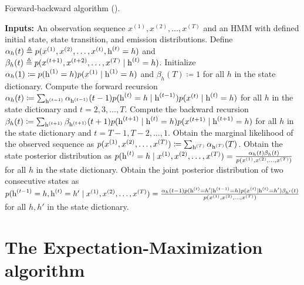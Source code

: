 \begin{algorithm}
    \caption{Forward-backward algorithm (\citet{Rabiner1986}).}
    \label{alg:forward_backward}
    \begin{algorithmic}[1]
        \State \textbf{Inputs:} An observation sequence $x^{(1)}, x^{(2)}, \dots, x^{(T)}$ and an HMM with defined initial state, state transition, and emission distributions.
        \vspace{0.3cm}
        \State Define $\alpha_h(t) \triangleq p(x^{(1)}, x^{(2)}, \dots, x^{(t)}, {\textnormal{h}}^{(t)}=h)$ and $\beta_h(t) \triangleq p(x^{(t+1)}, x^{(t+2)}, \dots, x^{(T)} \mid {\textnormal{h}}^{(t)}=h)$.
        \vspace{0.3cm}
        \State Initialize $\alpha_h(1) \coloneqq p({\textnormal{h}}^{(1)}=h)p(x^{(1)} \mid {\textnormal{h}}^{(1)}=h)$ and $\beta_h(T) \coloneqq 1$ for all $h$ in the state dictionary.
        \vspace{0.3cm}
        \State Compute the forward recursion $\alpha_h(t) \coloneqq \sum_{{\textnormal{h}}^{(t-1)}} \alpha_{{\textnormal{h}}^{(t-1)}}(t-1) p({\textnormal{h}}^{(t)}=h \mid {\textnormal{h}}^{(t-1)}) p(x^{(t)} \mid {\textnormal{h}}^{(t)}=h)$ for all $h$ in the state dictionary and $t=2, 3, \dots, T$.
        \vspace{0.3cm}
        \State Compute the backward recursion $\beta_h(t) \coloneqq \sum_{{\textnormal{h}}^{(t+1)}} \beta_{{\textnormal{h}}^{(t+1)}}(t+1) p({\textnormal{h}}^{(t+1)} \mid {\textnormal{h}}^{(t)}=h) p(x^{(t+1)} \mid {\textnormal{h}}^{(t+1)}=h)$ for all $h$ in the state dictionary and $t=T-1, T-2, \dots, 1$.
        \vspace{0.01cm}
        \State Obtain the marginal likelihood of the observed sequence as $p(x^{(1)}, x^{(2)}, \dots, x^{(T)}) \coloneqq \sum_{{\textnormal{h}}^{(T)}} \alpha_{{\textnormal{h}}^{(T)}}(T)$.
        \vspace{0.3cm}
        \State Obtain the state posterior distribution as $p({\textnormal{h}}^{(t)}=h \mid x^{(1)}, x^{(2)}, \dots, x^{(T)}) = \frac{\alpha_h(t)\beta_h(t)}{p(x^{(1)}, x^{(2)}, \dots, x^{(T)})}$ for all $h$ in the state dictionary.
        \vspace{0.3cm}
        \State Obtain the joint posterior distribution of two consecutive states as $p({\textnormal{h}}^{(t-1)}=h, {\textnormal{h}}^{(t)}=h' \mid x^{(1)}, x^{(2)}, \dots, x^{(T)}) = \frac{\alpha_h(t-1)p({\textnormal{h}}^{(t)}=h' \mid {\textnormal{h}}^{(t-1)}=h) p(x^{(t)} \mid {\textnormal{h}}^{(t)}=h')\beta_{h'}(t)}{p(x^{(1)}, x^{(2)}, \dots, x^{(T)})}$ for all $h,h'$ in the state dictionary.
    \end{algorithmic}
\end{algorithm}

\section{The Expectation-Maximization algorithm}
\label{sec:expectation_maximization}

